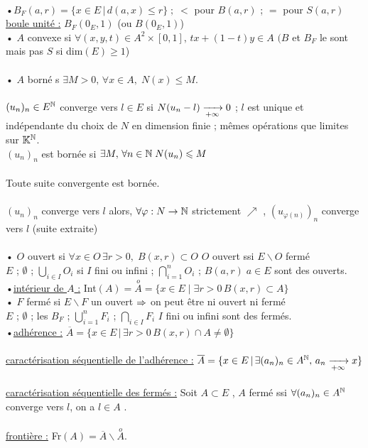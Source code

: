 \documentclass[12 pt]{book}
\begin{document}
\text{}\\
•$B_F(a,r) = \{x\in E \,|\, d(a,x)\leqslant r\} \; ; \; <$ pour $B(a,r)$ ; $ =$ pour $S(a,r)$\\
\underline{boule unité :} $B_F(0_E,1)$ \; (ou $B(0_E,1)$)\\
• $A$ convexe si $\forall(x,y,t)\in A^2\times [0,1], \, tx+(1-t)y \in A$  $(B$ et $B_F$ le sont mais pas $S$ si dim$(E) \geqslant 1$)\\
\text{}\\
• $A$ borné s $\exists M> 0, \, \forall x\in A, \; N(x)\leqslant M$.\\
\text{}\\
$(u_n)_n\in E^{\mathbb{N}}$ converge vers $l\in E$ si $N(u_n - l) \xrightarrow[+\infty]{} 0$ ; $l$ est unique et indépendante du choix de $N$ en dimension finie ; mêmes opérations que limites sur $\mathbb{K}^{\mathbb{N}}$.\\
$(u_n)_n$ est bornée si $\exists M, \, \forall n\in \mathbb{N} \; N(u_n)\leqslant M$\\
\text{}\\
Toute suite convergente est bornée.\\
\text{}\\
$(u_n)_n$ converge vers $l$ alors, $\forall \varphi : N \to \mathbb{N}$ strictement $\nearrow$ , $(u_{\varphi(n)})_n$ converge vers $l$ (suite extraite)\\
\text{}\\
• $O$ ouvert si $\forall x\in O \, \exists r>0 , \; B(x,r)\subset O$ \qquad \qquad \qquad $O$ ouvert ssi $E\backslash O$ fermé\\
$E$ ; $\emptyset$ ; $\bigcup_{i\in I} O_i$ si $I$ fini ou infini ; $\bigcap_{i =1}^n O_i$ ; $B(a,r) \; a\in E$ sont des ouverts.\\
•\underline{intérieur de $A$ :} Int$(A) = \overset{o}{A} = \{ x\in E \; | \; \exists r>0 \, B(x,r)\subset A\}$\\
• $F$ fermé si $E\backslash F$ un ouvert \qquad \qquad \qquad $\Rightarrow$ on peut être ni ouvert ni fermé \,\warning\\
$E$ ; $\emptyset$ ; les $B_F$ ; $\bigcup_{i=1}^n F_i$ ; $\bigcap_{i\in I} F_i$ $I$ fini ou infini sont des fermés.\\
•\underline{adhérence :} $\overline{A} = \{ x\in E\, |\, \exists r>0 \, B(x,r) \cap A \neq \emptyset \}$\\
\text{}\\
\underline{caractérisation séquentielle de l'adhérence :} $\overline{A} = \{ x\in E \, | \, \exists (a_n)_n \in A^{\mathbb{N}} , \, a_n \xrightarrow[+\infty]{} x\}$\\
\text{}\\
\underline{caractérisation séquentielle des fermés :} Soit $A\subset E$ , $A$ fermé ssi $\forall (a_n)_n\in A^{\mathbb{N}}$ converge vers $l$, on a $l \in A$ .\\
\text{}\\
\underline{frontière :} Fr$(A) = \overline{A}\backslash \overset{o}{A}$.\\
\end{document}
